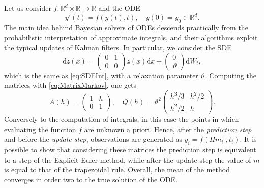 \documentclass{scrartcl}
\theoremstyle{definition}
\theoremstyle{remark}
\numberwithin{definition}{section}
\numberwithin{remark}{section}
\renewcommand{\theta}{\vartheta}
\newcommand{\R}{\mathbb{R}}
\newcommand{\dd}{\mathrm{d}}
\begin{document}
Let us consider $f\colon \R^d\times\R \to \R$ and the ODE
\begin{equation}
	y'(t) = f(y(t), t), \quad y(0) = y_0 \in \R^d.
\end{equation}
The main idea behind Bayesian solvers of ODEs descends practically from the probabilistic interpretation of approximate integrals, and their algorithms exploit the typical updates of Kalman filters. In particular, we consider the SDE
\begin{equation}
	\dd z(x) = \begin{pmatrix} 0 & 1 \\ 0 & 0\end{pmatrix} z(x) \dd x + \begin{pmatrix} 0 \\ \theta \end{pmatrix} \dd W_t,
\end{equation}
which is the same as \eqref{eq:SDEInt}, with a relaxation parameter $\theta$. Computing the matrices with \eqref{eq:MatrixMarkov}, one gets
\begin{equation}
	A(h) = \begin{pmatrix} 1 & h \\ 0 & 1\end{pmatrix}, \quad Q(h) = \theta^2 \begin{pmatrix} h^3/3 & h^2/2 \\ h^2/2 & h	\end{pmatrix}.
\end{equation}
Conversely to the computation of integrals, in this case the points in which evaluating the function $f$ are unknown a priori. Hence, after the \textit{prediction step} and before the \textit{update step}, observations are generated as $y_i = f(Hm_i^{-}, t_i)$. It is possible to show \cite{SDH14} that considering these matrices the prediction step is equivalent to a step of the Explicit Euler method, while after the update step the value of $m$ is equal to that of the trapezoidal rule. Overall, the mean of the method converges in order two to the true solution of the ODE. 
\end{document}
